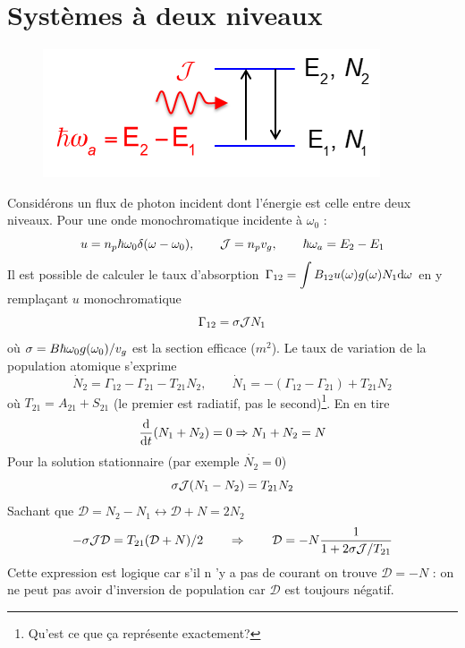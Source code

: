 \section{Systèmes à deux niveaux}
	\begin{figure}
	\vspace{-8mm}
	\includegraphics[scale=0.6]{ch4/image1.png}
	\end{figure}
Considérons un flux de photon incident dont l'énergie est celle entre deux niveaux. Pour une onde 
monochromatique incidente à $\omega_0$ :
\begin{equation}
u = {n_p}\hbar {\omega _0}\delta (\omega  - {\omega _0}),\qquad 
{{\cal J}} = {n_p}{v_g},\qquad \hbar\omega_a = E_2-E_1
\end{equation}
Il est possible de calculer le taux d'absorption $\DS{\Gamma _{12}} = \int {{B_{12}}u(\omega )g(\omega ){N_1}{\rm{d}}\omega }$ en y remplaçant $u$ monochromatique 
\begin{equation}
{\Gamma _{12}} = \sigma {{\cal J}}{N_1}
\end{equation}
où $\DS \sigma  = B\hbar {\omega _0}g({\omega _0})/{v_g}$ est la section efficace ($m^2$). Le taux 
de variation de la population atomique s'exprime
\begin{equation}
{\dot N_2} = {\Gamma _{12}} - {\Gamma _{21}} - {T_{21}}{N_2},\qquad
{\dot N_1} =  - ({\Gamma _{12}} - {\Gamma _{21}}) + {T_{21}}{N_2}
\end{equation}
où ${T_{21}} = {A_{21}} + {S_{21}}$ (le premier est radiatif, pas le second)\footnote{Qu'est ce que 
ça représente exactement?}. En en tire
\begin{equation}
\frac{{\rm{d}}}{{{\rm{d}}t}}({N_1} + {N_2}) = 0 \Rightarrow {N_1} + {N_2} = N
\end{equation}
Pour la solution stationnaire (par exemple $\dot{N_2}=0$)
\begin{equation}
\sigma {{\cal J}}({N_1} - {N_2}) = {T_{21}}{N_2}
\end{equation}
Sachant que $\mathcal{D}=N_2-N_1\leftrightarrow \mathcal{D}+N=2N_2$ 
\begin{equation}
 - \sigma {{\cal J}{\cal D}} = {T_{21}}({{\cal D}} + N)/2\qquad\Rightarrow\qquad
{{\cal D}} =  - N\frac{1}{{1 + 2\sigma {{\cal J}}/{T_{21}}}}
\end{equation}
Cette expression est logique car s'il n 'y a pas de courant on trouve $\mathcal{D}=-N$ : on ne peut 
pas avoir d'inversion de population car $\mathcal{D}$ est toujours négatif.\\

